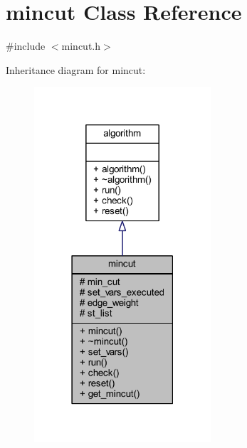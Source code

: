 \hypertarget{classmincut}{}\section{mincut Class Reference}
\label{classmincut}


{\ttfamily \#include $<$mincut.\+h$>$}



Inheritance diagram for mincut\+:\nopagebreak
\begin{figure}[H]
\begin{center}
\leavevmode
\includegraphics[width=186pt]{classmincut__inherit__graph}
\end{center}
\end{figure}


